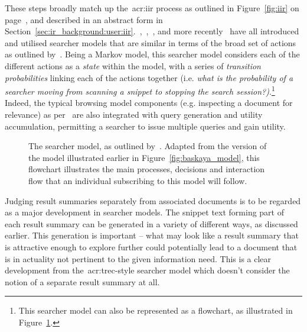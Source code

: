 These steps broadly match up the~\gls{acr:iir} process as outlined in Figure~\ref{fig:iir} on page~\pageref{fig:iir}, and described in an abstract form in Section~\ref{sec:ir_background:user:iir}.~\cite{azzopardi2011economics},~\cite{yilmaz2010browsing_utility},~\cite{carterette2011models}, and more recently~\cite{zhang2017simulation_model} have all introduced and utilised searcher models that are similar in terms of the broad set of actions as outlined by~\cite{baskaya2013behavioural_factors}. Being a Markov model, this searcher model considers each of the different actions as a \emph{state} within the model, with a series of \emph{transition probabilities} linking each of the actions together (i.e. \emph{what is the probability of a searcher moving from scanning a snippet to stopping the search session?)}.\footnote{This searcher model can also be represented as a flowchart, as illustrated in Figure~\ref{fig:baskaya_model_flow}.} Indeed, the typical browsing model components (e.g. inspecting a document for relevance) as per~\cite{carterette2011effectiveness_evaluation} are also integrated with query generation and utility accumulation, permitting a searcher to issue multiple queries and gain utility.

\begin{figure}[t!]
    \centering
    \caption[Flowchart of the search process by~\cite{baskaya2013behavioural_factors}]{The searcher model, as outlined by~\cite{baskaya2013behavioural_factors}. Adapted from the version of the model illustrated earlier in Figure~\ref{fig:baskaya_model}, this flowchart illustrates the main processes, decisions and interaction flow that an individual subscribing to this model will follow.}
    \label{fig:baskaya_model_flow}
\end{figure}

Judging result summaries separately from associated documents is to be regarded as a major development in searcher models. The snippet text forming part of each result summary can be generated in a variety of different ways, as discussed earlier. This generation is important -- what may look like a result summary that is attractive enough to explore further could potentially lead to a document that is in actuality not pertinent to the given information need. This is a clear development from the~\gls{acr:trec}-style searcher model which doesn't consider the notion of a separate result summary at all.

